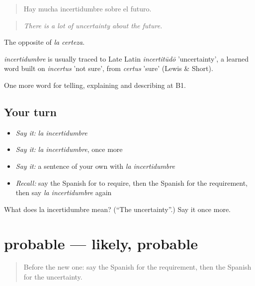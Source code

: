 \begin{quote}
Hay mucha incertidumbre sobre el futuro.
\end{quote}

\begin{quote}
\emph{There is a lot of uncertainty about the future.}
\end{quote}

The opposite of \emph{la certeza}.

\begin{cousinweb}
\emph{incertidumbre} is usually traced to Late Latin \emph{incertitūdō} 'uncertainty', a learned word built on \emph{incertus} 'not sure', from \emph{certus} 'sure' (Lewis \& Short).
\end{cousinweb}

\begin{grammarlens}[title={What you've built}]
One more word for telling, explaining and describing at B1.
\end{grammarlens}

\subsection*{Your turn}
\begin{itemize}
\raggedright
  \item \emph{Say it:} \emph{la incertidumbre}
  \item \emph{Say it:} \emph{la incertidumbre}, once more
  \item \emph{Say it:} a sentence of your own with \emph{la incertidumbre}
  \item \emph{Recall:} say the Spanish for to require, then the Spanish for the requirement, then say \emph{la incertidumbre} again
\end{itemize}

\begin{tcolorbox}[breakable,colback=teal!4,colframe=teal!35!black,title={Before you move on}]
What does la incertidumbre mean? (\textquotedblleft{}The uncertainty\textquotedblright{}.) Say it once more.
\end{tcolorbox}
\section[probable]{probable — likely, probable}

\label{lesson:ES-C613-probable}



\begin{quote}
Before the new one: say the Spanish for the requirement, then the Spanish for the uncertainty.
\end{quote}

